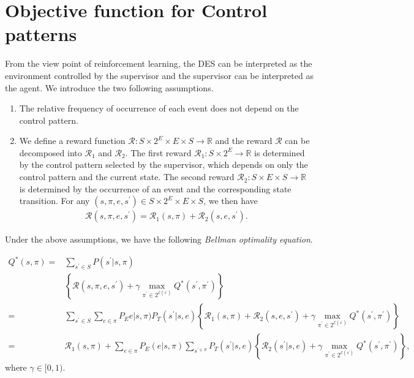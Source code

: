 \documentclass[10 pt, dvipdfmx]{article}
\theoremstyle{definition}
\begin{document}

\section{Objective function for Control patterns}
From the view point of reinforcement learning, the DES can be interpreted as the environment controlled by the supervisor and the supervisor can be interpreted as the agent. We introduce the two following assumptions.

\begin{enumerate}
  \item The relative frequency of occurrence of each event does not depend on the control pattern.
  \item We define a reward function $\mathcal{R} : S \times 2^E \times E \times S \rightarrow \mathbb{R}$ and the reward $\mathcal{R}$ can be decomposed into $\mathcal{R}_1$ and $\mathcal{R}_2$. The first reward $\mathcal{R}_1 : S \times 2^E \rightarrow \mathbb{R}$ is determined by the control pattern selected by the supervisor, which depends on only the control pattern and the current state. The second reward $\mathcal{R}_2 : S \times E \times S \rightarrow \mathbb{R}$ is determined by the occurrence of an event and the corresponding state transition. For any $(s,\pi,e,s^{\prime}) \in S \times 2^E \times E \times S$, we then have
  \begin{align}
    \mathcal{R}(s,\pi,e,s^{\prime}) = \mathcal{R}_1(s,\pi) + \mathcal{R}_2(s,e,s^{\prime}).
  \end{align}
\end{enumerate}
Under the above assumptions, we have the following {\it Bellman optimality equation}.

\begin{align}
  Q^{\ast}(s,\pi) = & \sum_{s^{\prime} \in S} P(s^{\prime}|s,\pi)\nonumber \\
  & \left \{ \mathcal{R}(s,\pi,e,s^{\prime}) + \gamma \max_{\pi^{\prime} \in 2^{\mathcal{E}(s^{\prime})}} Q^{\ast}(s^{\prime},\pi^{\prime}) \right \} \nonumber \\
  = & \sum_{s^{\prime} \in S} \sum_{e \in \pi} P_Ee|s,\pi) P_T(s^{\prime}|s,e) \left \{ \mathcal{R}_1(s,\pi) + \mathcal{R}_2(s,e,s^{\prime}) + \gamma \max_{\pi^{\prime} \in 2^{\mathcal{E}(s^{\prime})}} Q^{\ast}(s^{\prime},\pi^{\prime}) \right \} \nonumber \\
  = & \mathcal{R}_1(s,\pi) + \sum_{e \in \pi} P_E(e|s,\pi) \sum_{s^{\prime \in S}} P_T(s^{\prime}|s,e) \left \{ \mathcal{R}_2(s^{\prime}|s,e) + \gamma \max_{\pi^{\prime} \in 2^{\mathcal{E}(s^{\prime})}} Q^{\ast}(s^{\prime}, \pi^{\prime}) \right \},
\end{align}
where $\gamma \in [0,1)$.
\end{document}
